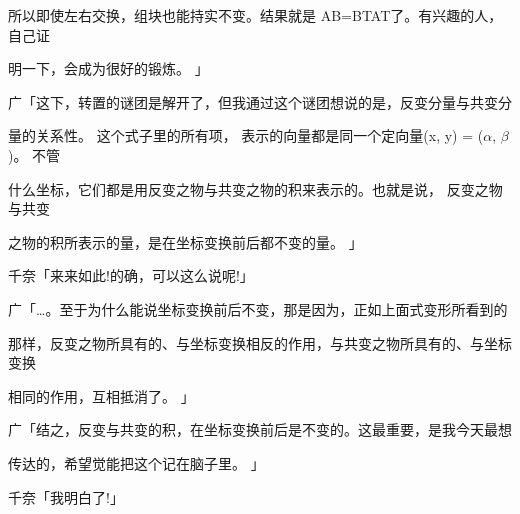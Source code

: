 所以即使左右交换，组块也能持实不变。结果就是 AB=BTAT了。有兴趣的人，自己证\par
明一下，会成为很好的锻炼。 」\par
广「这下，转置的谜团是解开了，但我通过这个谜团想说的是，反变分量与共变分\par
量的关系性。 这个式子里的所有项， 表示的向量都是同一个定向量(x, y) = ($\alpha$, $\beta$)。 不管\par
什么坐标，它们都是用反变之物与共变之物的积来表示的。也就是说， 反变之物与共变\par
之物的积所表示的量，是在坐标变换前后都不变的量。 」\par
千奈「来来如此!的确，可以这么说呢!」\par
广「…。至于为什么能说坐标变换前后不变，那是因为，正如上面式变形所看到的\par
那样，反变之物所具有的、与坐标变换相反的作用，与共变之物所具有的、与坐标变换\par
相同的作用，互相抵消了。 」\par
广「结之，反变与共变的积，在坐标变换前后是不变的。这最重要，是我今天最想\par
传达的，希望觉能把这个记在脑子里。 」\par
千奈「我明白了!」\par

